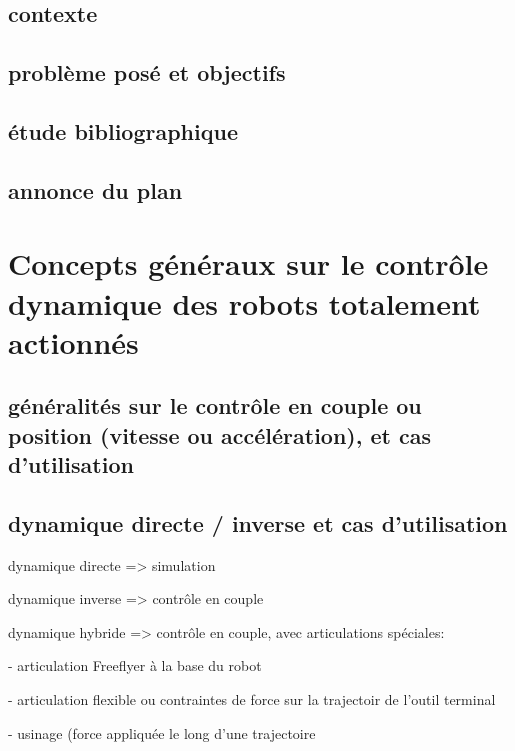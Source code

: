 \documentclass{report}
\begin{document}
\section*{contexte}


\section*{problème posé et objectifs}


\section*{étude bibliographique}


\section*{annonce du plan}



\chapter{Concepts généraux sur le contrôle dynamique des robots totalement actionnés}

\section{généralités sur le contrôle en couple ou position (vitesse ou accélération), et cas d'utilisation}

\section{dynamique directe / inverse et cas d'utilisation}

dynamique directe => simulation
\vspace{0.3cm}

dynamique inverse => contrôle en couple
\vspace{0.3cm}

dynamique hybride => contrôle en couple, avec articulations spéciales:
\vspace{0.3cm}

	- articulation Freeflyer à la base du robot

	- articulation flexible	ou contraintes de force sur la trajectoir de l'outil terminal
	
	- usinage (force appliquée le long d'une trajectoire
	
\end{document}
